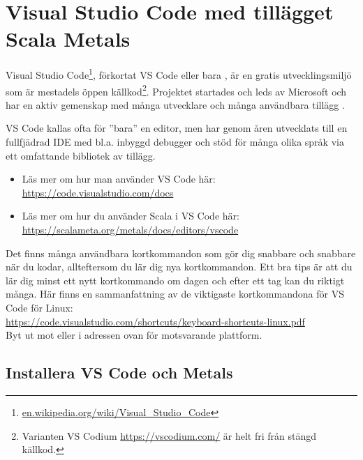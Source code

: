 
\section{Visual Studio Code med tillägget Scala Metals}\label{appendix:ide:vscode}

Visual Studio Code\footnote{\href{https://en.wikipedia.org/wiki/Visual\_Studio\_Code}{en.wikipedia.org/wiki/Visual\_Studio\_Code}}, förkortat VS Code eller bara , är en gratis utvecklingsmiljö som är mestadels öppen källkod\footnote{Varianten VS Codium \url{https://vscodium.com/} är helt fri från stängd källkod.}. Projektet startades och leds av Microsoft och har en aktiv gemenskap med många utvecklare och många användbara tillägg .

VS Code kallas ofta för ''bara'' en editor, men har genom åren utvecklats till en fullfjädrad IDE med bl.a. inbyggd debugger och stöd för många olika språk via ett omfattande bibliotek av tillägg.%

\begin{itemize}
\item 
Läs mer om hur man använder VS Code här: \\
\url{https://code.visualstudio.com/docs}

\item
Läs mer om hur du använder Scala i VS Code här: \\
\url{https://scalameta.org/metals/docs/editors/vscode}

\end{itemize}

Det finns många användbara kortkommandon som gör dig snabbare och snabbare när du kodar, allteftersom du lär dig nya kortkommandon. Ett bra tips är att du lär dig minst ett nytt kortkommando om dagen och efter ett tag kan du riktigt många. Här finns en sammanfattning av de viktigaste kortkommandona för VS Code för Linux:\\
\url{https://code.visualstudio.com/shortcuts/keyboard-shortcuts-linux.pdf}\\
Byt ut  mot  eller  i adressen ovan för motsvarande plattform.

\subsection{Installera VS Code och Metals}\label{appendix:ide:vscode:install}

